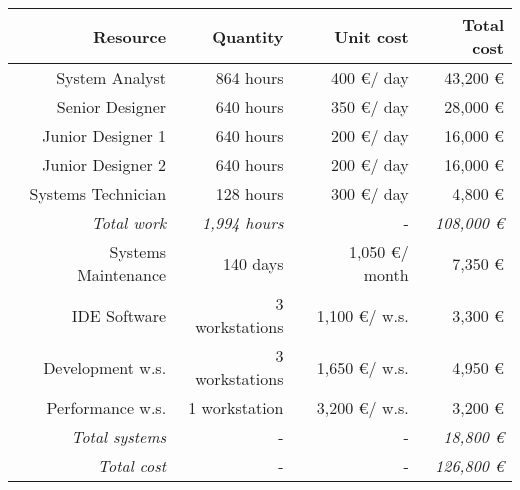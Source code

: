 \begin{tabular}{r|rr|r}
\textbf{Resource} & \textbf{Quantity} & \textbf{Unit cost} & \textbf{Total cost} \\ \hline
System Analyst & 864 hours & 400 \euro / day & 43,200 \euro \\
Senior Designer & 640 hours & 350 \euro / day & 28,000 \euro \\
Junior Designer 1 & 640 hours & 200 \euro / day & 16,000 \euro \\
Junior Designer 2 & 640 hours & 200 \euro / day & 16,000 \euro \\
Systems Technician & 128 hours & 300 \euro / day & 4,800 \euro \\ \hline
\textit{Total work} & \textit{1,994 hours} & - & \textit{108,000 \euro} \\ \hline \hline
Systems Maintenance & 140 days & 1,050 \euro / month & 7,350 \euro \\
IDE Software & 3 workstations & 1,100 \euro / w.s. & 3,300 \euro \\
Development w.s. & 3 workstations & 1,650 \euro / w.s. & 4,950 \euro \\
Performance w.s. & 1 workstation & 3,200 \euro / w.s. & 3,200 \euro \\ \hline
\textit{Total systems} & - & - & \textit{18,800 \euro} \\ \hline \hline
\textit{Total cost} & - & - & \textit{126,800 \euro}

\end{tabular}
